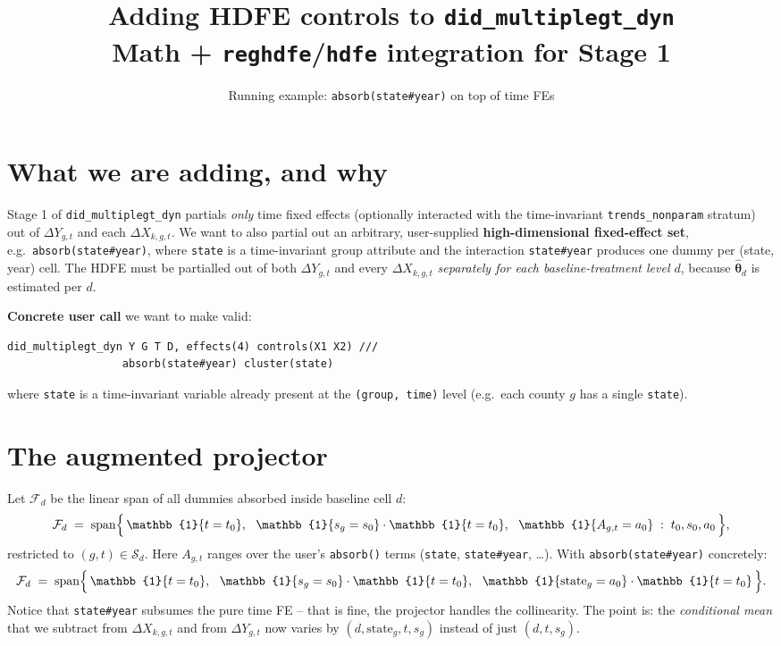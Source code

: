 \documentclass[11pt]{article}
\title{\textbf{Adding HDFE controls to \texttt{did\_multiplegt\_dyn}} \\[2pt]
       \large Math + \texttt{reghdfe}/\texttt{hdfe} integration for Stage 1}
\author{Running example: \texttt{absorb(state\#year)} on top of time FEs}
\date{}
\newcommand{\1}{\mathbb{1}}
\newcommand{\Smpl}{\mathcal{S}}
\newcommand{\thetad}{\widehat{\bm{\theta}}_d}
\newcommand{\dY}{\Delta Y_{g,t}}
\newcommand{\dXk}{\Delta X_{k,g,t}}
\begin{document}
\maketitle

\section{What we are adding, and why}

\begin{tcolorbox}[colback=codebg, colframe=navy, boxrule=0.6pt, arc=1pt]
Stage 1 of \texttt{did\_multiplegt\_dyn} partials \emph{only} time fixed
effects (optionally interacted with the time-invariant
\texttt{trends\_nonparam} stratum) out of $\dY$ and each $\dXk$.\;
We want to also partial out an arbitrary, user-supplied
\textbf{high-dimensional fixed-effect set}, e.g.\
\texttt{absorb(state\#year)}, where \texttt{state} is a time-invariant
group attribute and the interaction \texttt{state\#year} produces one
dummy per (state, year) cell.\;
The HDFE must be partialled out of both $\dY$ and every $\dXk$
\emph{separately for each baseline-treatment level $d$}, because $\thetad$
is estimated per $d$.
\end{tcolorbox}

\medskip\noindent
\textbf{Concrete user call} we want to make valid:
\begin{lstlisting}
did_multiplegt_dyn Y G T D, effects(4) controls(X1 X2) ///
                  absorb(state#year) cluster(state)
\end{lstlisting}

\noindent
where \texttt{state} is a time-invariant variable already present at the
\texttt{(group, time)} level (e.g.\ each county $g$ has a single \texttt{state}).

\section{The augmented projector}

Let $\mathcal{F}_d$ be the linear span of all dummies absorbed inside baseline
cell $d$:
\begin{equation}
\mathcal{F}_d \;=\; \mathrm{span}\Bigl\{\, \1\{t = t_0\},\ \ \1\{s_g = s_0\}\cdot\1\{t=t_0\},\ \ \1\{A_{g,t} = a_0\}\;:\;t_0, s_0, a_0\,\Bigr\},
\label{eq:Fd}
\end{equation}
restricted to $(g,t)\in\Smpl_d$. Here $A_{g,t}$ ranges over the user's
\texttt{absorb()} terms (\texttt{state}, \texttt{state\#year}, \dots).
With \texttt{absorb(state\#year)} concretely:
\[
\mathcal{F}_d \;=\; \mathrm{span}\Bigl\{\,\1\{t=t_0\},\ \ \1\{s_g=s_0\}\cdot\1\{t=t_0\},\ \ \1\{\mathrm{state}_g = a_0\}\cdot \1\{t=t_0\}\,\Bigr\}.
\]
Notice that \texttt{state\#year} subsumes the pure time FE -- that is fine, the
projector handles the collinearity. The point is: the \emph{conditional mean}
that we subtract from $\dXk$ and from $\dY$ now varies by $(d, \mathrm{state}_g, t, s_g)$
instead of just $(d, t, s_g)$.
\end{document}
